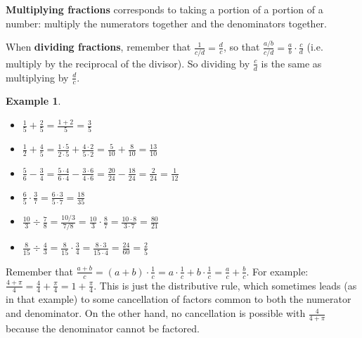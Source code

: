 \documentclass[11pt]{book}               %
\newtheorem{example}{Example}
\begin{document}
 {\bf Multiplying fractions} corresponds to taking a portion of a portion of a number:  multiply the numerators together and the denominators together. 

 When {\bf dividing fractions}, remember that $ \frac{1}{ c/d} = \frac{d}{c}$, so that $ \frac{a/b}{c/d} =  \frac{a}{b} \cdot \frac{c}{d} $  (i.e. multiply by the reciprocal of the divisor).  So dividing by $\frac{c}{d}$ is the same as multiplying by $\frac{d}{c}$.

\begin{example}
$ $
\begin{itemize}
\item $ \frac{1}{5} + \frac{2}{5} = \frac{1+2}{5}=\frac{3}{5}$
\item $ \frac{1}{2} + \frac{4}{5} = \frac{1 \cdot 5}{2 \cdot 5}+ \frac{4 \cdot 2}{5 \cdot 2} = \frac{5}{10} + \frac{8}{10} = \frac{13}{10}$
\item $ \frac{5}{6} - \frac{3}{4} = \frac{5 \cdot 4}{6 \cdot 4} - \frac{3 \cdot 6}{4 \cdot 6} = \frac{20}{24} - \frac{18}{24} = \frac{2}{24} = \frac{1}{12}$
\item $ \frac{6}{5} \cdot \frac{3}{7} = \frac{6 \cdot 3}{5 \cdot 7} = \frac{18}{35}$
\item $ \frac{10}{3} \div \frac{7}{8} = \frac{10/3}{7/8}  = \frac{10}{3} \cdot \frac{8}{7} = \frac{10 \cdot 8}{3 \cdot 7} = \frac{80}{21} $
\item $ \frac{8}{15} \div \frac{4}{3} = \frac{8}{15} \cdot \frac{3}{4} = \frac{8 \cdot 3}{15 \cdot 4} = \frac{24}{60} = \frac{2}{5} $
\end{itemize}
\end{example}


Remember that $\frac{a+b}{c}=(a+b)\cdot\frac{1}{c}=a\cdot\frac{1}{c}+b\cdot\frac{1}{c}=\frac{a}{c}+\frac{b}{c}$. For example:
$\frac{4+\pi}{4}=\frac{4}{4}+\frac{\pi}{4}=1+\frac{\pi}{4}$. This is just the distributive rule, which sometimes leads (as in that example) to some cancellation of factors common to both the numerator and denominator. 
On the other hand, no cancellation is possible with $\frac{4}{4+\pi}$ because the denominator cannot be factored.
\end{document}
